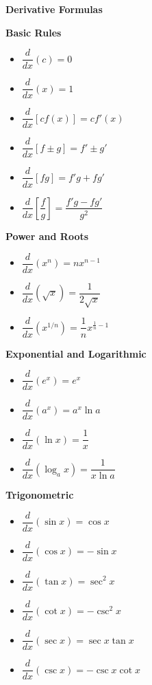 \documentclass[12pt]{article}
\begin{document}
\begin{center}
    {\LARGE \textbf{Derivative Formulas}}
\end{center}

\begin{multicols}{2}

\textbf{Basic Rules}
\begin{itemize}
  \item $\dfrac{d}{dx}(c) = 0$
  \item $\dfrac{d}{dx}(x) = 1$
  \item $\dfrac{d}{dx}[cf(x)] = c f'(x)$
  \item $\dfrac{d}{dx}[f \pm g] = f' \pm g'$
  \item $\dfrac{d}{dx}[fg] = f'g + fg'$
  \item $\dfrac{d}{dx}\left[\dfrac{f}{g}\right] = \dfrac{f'g - fg'}{g^2}$
\end{itemize}

\textbf{Power and Roots}
\begin{itemize}
  \item $\dfrac{d}{dx}(x^n) = nx^{n-1}$
  \item $\dfrac{d}{dx}(\sqrt{x}) = \dfrac{1}{2\sqrt{x}}$
  \item $\dfrac{d}{dx}(x^{1/n}) = \dfrac{1}{n}x^{\frac{1}{n}-1}$
\end{itemize}

\textbf{Exponential and Logarithmic}
\begin{itemize}
  \item $\dfrac{d}{dx}(e^x) = e^x$
  \item $\dfrac{d}{dx}(a^x) = a^x \ln a$
  \item $\dfrac{d}{dx}(\ln x) = \dfrac{1}{x}$
  \item $\dfrac{d}{dx}(\log_a x) = \dfrac{1}{x \ln a}$
\end{itemize}

\textbf{Trigonometric}
\begin{itemize}
  \item $\dfrac{d}{dx}(\sin x) = \cos x$
  \item $\dfrac{d}{dx}(\cos x) = -\sin x$
  \item $\dfrac{d}{dx}(\tan x) = \sec^2 x$
  \item $\dfrac{d}{dx}(\cot x) = -\csc^2 x$
  \item $\dfrac{d}{dx}(\sec x) = \sec x \tan x$
  \item $\dfrac{d}{dx}(\csc x) = -\csc x \cot x$
\end{itemize}


\end{multicols}
\end{document}
